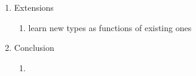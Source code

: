 \documentclass[11pt]{article}
\begin{document}
\begin{enumerate}
\begin{enumerate}
\begin{enumerate}
        \item 
        \end{enumerate}
    \item Extensions
        \begin{enumerate}
        \item learn new types as functions of existing ones
        \end{enumerate}
    \item Conclusion
        \begin{enumerate}
        \item 
        \end{enumerate}
    \end{enumerate}
\end{enumerate}



\end{document}
